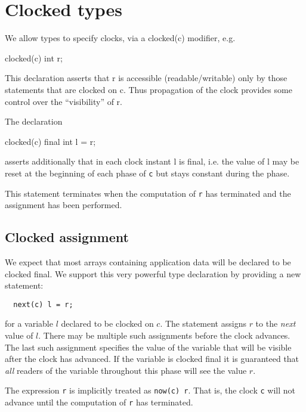 \section{Clocked types}

We allow types to specify clocks, via a {\cf clocked(c)} modifier,
e.g.{}

\begin{x10}
  clocked(c) int r;
\end{x10}

This declaration asserts that {\cf r} is accessible
(readable/writable) only by those statements that are clocked on {\cf
c}. Thus propagation of the clock provides some control over the
``visibility'' of {\cf r}.

The declaration 

\begin{x10}
  clocked(c) final int l = r;
\end{x10}

\noindent asserts additionally that in each clock instant {\cf l} is final, 
i.e.{} the value of {\cf l} may be reset at the beginning of each phase
of {\tt c} but stays constant during the phase.

This statement terminates when the computation of {\tt r} has
terminated and the assignment has been performed.


\subsection{Clocked assignment}
We expect that most arrays containing application data will be
declared to be {\cf clocked final}. We support this very powerful type
declaration by providing a new statement:
{\footnotesize
\begin{verbatim}
  next(c) l = r; 
\end{verbatim}}


\noindent 
for a variable $l$ declared to be clocked on $c$. The statement
assigns $r$ to the {\em next} value of $l$. There may be multiple such
assignments before the clock advances. The last such assignment
specifies the value of the variable that will be visible after the
clock has advanced.  If the variable is {\cf clocked final} it is
guaranteed that {\em all} readers of the variable throughout this
phase will see the value $r$.

The expression {\tt r} is implicitly treated as {\tt now(c) r}. That
is, the clock {\tt c} will not advance until the computation of {\tt r} has
terminated.

